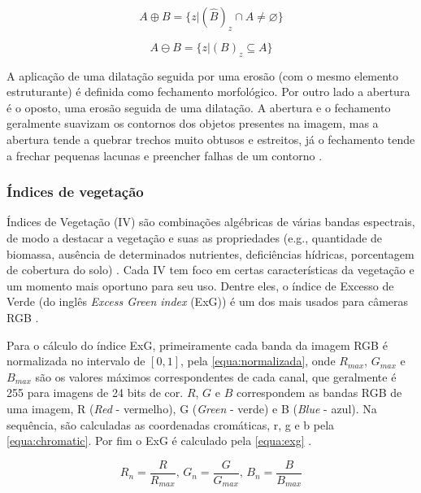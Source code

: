 \documentclass[12pt, a4paper, english, brazil]{article}
\begin{document}
\begin{equation}
    A \oplus B = \{z | (\hat{B})_z \cap A \neq \varnothing \}
    \label{equa:dilatacao}
\end{equation}

\begin{equation}
    A \ominus B = \{ z | (B)_z \subseteq A\}
    \label{equa:erosao}
\end{equation}

A aplicação de uma dilatação seguida por uma erosão (com o mesmo elemento estruturante) é definida como fechamento morfológico. Por outro lado a abertura é o oposto, uma erosão seguida de uma dilatação. A abertura e o fechamento geralmente suavizam os contornos dos objetos presentes na imagem, mas a abertura tende a quebrar trechos muito obtusos e estreitos, já o fechamento tende a frechar pequenas lacunas e preencher falhas de um contorno \cite{Gonzalez_Woods_2010, Kaur_Sahambi_2015}.

\subsubsection{Índices de vegetação}

Índices de Vegetação (IV) são combinações algébricas de várias bandas espectrais, de modo a destacar a vegetação e suas as propriedades (e.g., quantidade de biomassa, ausência de determinados nutrientes, deficiências hídricas, porcentagem de cobertura do solo) \cite{Candiago_2015}. Cada IV tem foco em certas características da vegetação e um momento mais oportuno para seu uso. Dentre eles, o índice de Excesso de Verde (do inglês \textit{Excess Green index} (ExG)) é um dos mais usados para câmeras RGB \cite{Pereira_Junior_2020}. 

Para o cálculo do índice ExG, primeiramente cada banda da imagem RGB é normalizada no intervalo de $[0, 1]$, pela \autoref{equa:normalizada}, onde $R_{max}$, $G_{max}$ e $B_{max}$ são os valores máximos correspondentes de cada canal, que geralmente é 255 para imagens de 24 bits de cor. $R$, $G$ e $B$ correspondem as bandas RGB de uma imagem, R (\textit{Red} - vermelho), G (\textit{Green} - verde) e B (\textit{Blue} - azul). Na sequência, são calculadas as coordenadas cromáticas, r, g e b pela \autoref{equa:chromatic}. Por fim o ExG é calculado pela \autoref{equa:exg} \cite{Garcia_2017}.

\begin{equation}
    R_n = \frac{R}{R_{max}} \text{, } G_n = \frac{G}{G_{max}} \text{, } B_n = \frac{B}{B_{max}}
    \label{equa:normalizada}
\end{equation}
\end{document}
